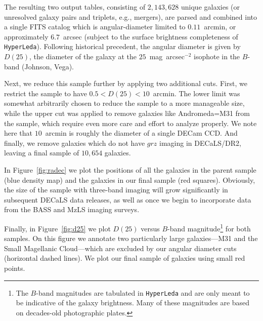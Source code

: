 \noindent The resulting two output tables, consisting of $2,143,628$ unique
galaxies (or unresolved galaxy pairs and triplets, e.g., mergers), are parsed
and combined into a single FITS catalog which is angular-diameter limited to
$0.11$~arcmin, or approximately $6.7$~arcsec (subject to the surface brightness
completeness of {\tt HyperLeda}).  Following historical precedent, the angular
diameter is given by $D(25)$, the diameter of the galaxy at the
$25$~mag~arcsec$^{-2}$ isophote in the $B$-band (Johnson, Vega).

Next, we reduce this sample further by applying two additional cuts.  First, we
restrict the sample to have $0.5<D(25)<10$~arcmin.  The lower limit was somewhat
arbitrarily chosen to reduce the sample to a more manageable size, while the
upper cut was applied to remove galaxies like Andromeda=M31 from the sample,
which require even more care and effort to analyze properly.  We note here that
$10$~arcmin is roughly the diameter of a single DECam CCD.  And finally, we
remove galaxies which do not have $grz$ imaging in DECaLS/DR2, leaving a final
sample of $10,654$ galaxies.

In Figure~\ref{fig:radec} we plot the positions of all the galaxies in the
parent sample (blue density map) and the galaxies in our final sample (red
squares).  Obviously, the size of the sample with three-band imaging will grow
significantly in subsequent DECaLS data releases, as well as once we begin to
incorporate data from the BASS and MzLS imaging surveys.


Finally, in Figure~\ref{fig:d25} we plot $D(25)$ versus $B$-band
magnitude\footnote{The $B$-band magnitudes are tabulated in {\tt HyperLeda} and
  are only meant to be indicative of the galaxy brightness.  Many of these
  magnitudes are based on decades-old photographic plates.} for both samples.
On this figure we annotate two particularly large galaxies---M31 and the Small
Magellanic Cloud---which are excluded by our angular diameter cuts (horizontal
dashed lines).  We plot our final sample of galaxies using small red points.

